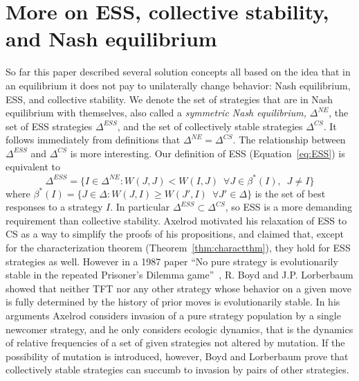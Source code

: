 \section{More on ESS, collective stability, and Nash equilibrium}
So far this paper described several solution concepts all based on the idea that in an equilibrium it does not pay to unilaterally change behavior: Nash equilibrium, ESS, and collective stability. We denote the set of strategies that are in Nash equilibrium with themselves, also called a \textit{symmetric Nash equilibrium,} $\Delta^{NE}$, the set of ESS strategies $\Delta^{ESS}$, and the set of collectively stable strategies $\Delta^{CS}$. It follows immediately from definitions that $\Delta^{NE} = \Delta^{CS}$. The relationship between $\Delta^{ESS}$ and $\Delta^{CS}$ is more interesting. Our definition of ESS (Equation~\ref{eq:ESS}) is equivalent to
\[
\Delta^{ESS} = \{I \in \Delta^{NE} : W(J, J) < W(I, J) \enspace \forall J \in \beta^*(I),\enspace J\neq I \}
\]
where $\beta^*(I) = \{J \in \Delta : W(J, I) \geq W(J', I) \enspace \forall J' \in \Delta\}$ is the set of best responses to a strategy $I$. In particular $\Delta^{ESS} \subset \Delta^{CS}$, so ESS is a more demanding requirement than collective stability. Axelrod motivated his relaxation of ESS to CS as a way to simplify the proofs of his propositions, and claimed that, except for the characterization theorem (Theorem~\ref{thm:charactthm}), they hold for ESS strategies as well. However in a 1987 paper ``No pure strategy is evolutionarily stable in the repeated Prisoner's Dilemma game''~\cite{Boyd_Lorberbaum_1987}, R. Boyd and J.P. Lorberbaum showed that neither TFT nor any other strategy whose behavior on a given move is fully determined by the history of prior moves is evolutionarily stable. In his arguments Axelrod considers invasion of a pure strategy population by a single newcomer strategy, and he only considers ecologic dynamics, that is the dynamics of relative frequencies of a set of given strategies not altered by mutation. If the possibility of mutation is introduced, however, Boyd and Lorberbaum prove that collectively stable strategies can succumb to invasion by pairs of other strategies.

